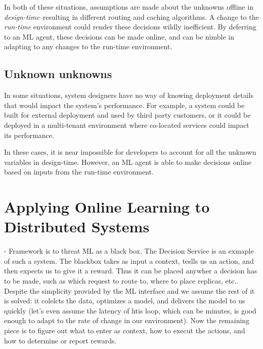 \documentclass[a4paper,twocolumn]{article}
\newcommand{\ignore}[1]{}
\begin{document}
In both of these situations, assumptions are made about the unknowns offline in
\emph{design-time}--resulting in different routing and caching
algorithms. A change to the \emph{run-time} environment could render these
decisions wildly inefficient. By deferring to an ML agent, these decisions can
be made online, and can be nimble in adapting to any changes to the run-time
environment.

\subsection*{Unknown unknowns}
In some situations, system designers have no way of knowing deployment details
that would impact the system's performance. For example, a system could be built
for external deployment and used by third party customers, or it could be
deployed in a multi-tenant environment where co-located services could impact
its performance.

In these cases, it is near impossible for developers to account for all the
unknown variables in design-time. However, an ML agent is able to make decisions
online based on inputs from the run-time environment.

\ignore{
To be clear, ML has been used in some distributed systems. However, it has not
been used in a general way to make online decisions about core distributed
systems implementation details. We advocate that developers should focus on
high-level objectives of their system, and use online ML to make to compute the
specifics (such as policies for request routing, replica placement, or failure
monitoring) at run-time based on observed metrics.
}

\section{Applying Online Learning to Distributed Systems}

- Framework is to threat ML as a black box. The Decision Service is an exmaple of such a system.
The blackbox takes as input a context, teslls us an action, and then expects us to give it
a reward. Thus it can be placed anywher a decision has to be made, such as which request
to route to, where to place replicas, etc.. Despite the simplicity provided by the ML interface
and we assume the rest of it is solved: it colelcts the data, optimizes a model, and delivers the model
to us quickly (let's even assume the latency of htis loop, which can be minutes, is good enough to adapt
to the rate of change in our environment). Now the remaining piece is to figure out what
to enter as context, how to execut the actions, and how to determine or report rewards.
\end{document}
